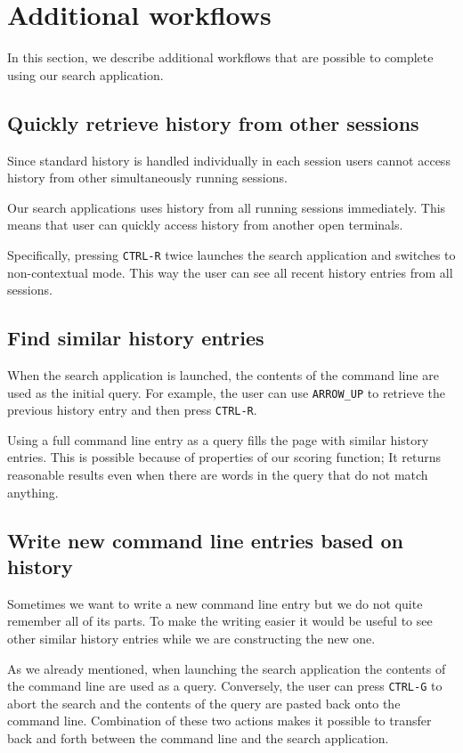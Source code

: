 \section{Additional workflows}

In this section, we describe additional workflows that are possible to complete using our search application. 

\subsection{Quickly retrieve history from other sessions}

Since standard history is handled individually in each session users cannot access history from other simultaneously running sessions. 

Our search applications uses history from all running sessions immediately. This means that user can quickly access history from another open terminals. 

Specifically, pressing \verb|CTRL-R| twice launches the search application and switches to non-contextual mode. This way the user can see all recent history entries from all sessions.

\subsection{Find similar history entries}

When the search application is launched, the contents of the command line are used as the initial query. For example, the user can use \verb|ARROW_UP| to retrieve the previous history entry and then press \verb|CTRL-R|. 

Using a full command line entry as a query fills the page with similar history entries. This is possible because of properties of our scoring function; It returns reasonable results even when there are words in the query that do not match anything. 

\subsection{Write new command line entries based on history}

Sometimes we want to write a new command line entry but we do not quite remember all of its parts. To make the writing easier it would be useful to see other similar history entries while we are constructing the new one.

As we already mentioned, when launching the search application the contents of the command line are used as a query. Conversely, the user can press \verb|CTRL-G| to abort the search and the contents of the query are pasted back onto the command line.
Combination of these two actions makes it possible to transfer back and forth between the command line and the search application. 

